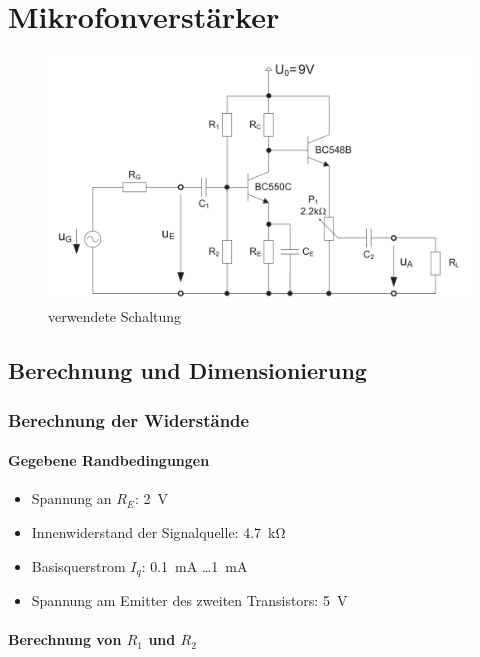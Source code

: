 \chapter{Mikrofonverstärker}

\begin{figure}[H]
    \centering
    \includegraphics[width = \textwidth]{tex/1_Microphone/pictures/Schaltung.png}
    \caption{verwendete Schaltung}
\end{figure}

\section{Berechnung und Dimensionierung}
\subsection{Berechnung der Widerstände}
\subsubsection{Gegebene Randbedingungen}

\begin{itemize}
    \item Spannung an $R_E$: \SI{2}{\volt}
    \item Innenwiderstand der Signalquelle: \SI{4.7}{\kilo \ohm}
    \item Basisquerstrom $I_q$: \SI{0.1}{\milli \ampere} \ldots \SI{1}{\milli \ampere}
    \item Spannung am Emitter des zweiten Transistors: \SI{5}{\volt}
\end{itemize}

\subsubsection{Berechnung von $R_1$ und $R_2$}

